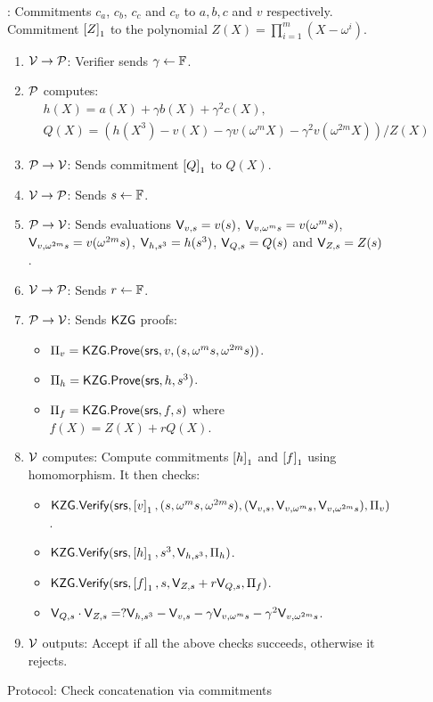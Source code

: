 \begin{figure}[htbp]
	\centering
	\begin{mdframed}
		{\footnotesize
			: Commitments $c_a$, $c_b$, $c_c$ and $c_v$ to $a,b,c$ and $v$ respectively. Commitment $\gone{Z}$ to the polynomial
			$Z(X)=\prod_{i=1}^m (X-\omega^i)$.
			\begin{enumerate}[leftmargin=2em]
				\item $\verifier\rightarrow\prover$: Verifier sends $\gamma\gets \F$.
				\item $\prover$ computes:
				\begin{align}
					& h(X) = a(X) + \gamma b(X) + \gamma^2 c(X),\\
					& Q(X) = (h(X^3) - v(X) - \gamma v(\omega^m X) - \gamma^2 v(\omega^{2m} X))/Z(X)
				\end{align}
				\item $\prover\rightarrow\verifier$: Sends commitment $\gone{Q}$ to $Q(X)$.
				\item $\verifier\rightarrow\prover$: Sends $s\gets\F$.
				\item $\prover\rightarrow\verifier$: Sends evaluations $\val{s}{v}=v(s)$, $\val{\omega^m s}{v}=v(\omega^m s)$,
				$\val{\omega^{2m}s}{v}=v(\omega^{2m} s)$, $\val{s^3}{h}=h(s^3)$, $\val{s}{Q}=Q(s)$ and $\val{s}{Z}=Z(s)$.
				\item $\verifier\rightarrow\prover$: Sends $r\gets\F$.
				\item $\prover\rightarrow\verifier$: Sends $\kzg$ proofs:
				\begin{itemize}[leftmargin=2em]
					\item $\Pi_v=\kzgprove(\srs,v,(s,\omega^m s, \omega^{2m}s))$.
					\item $\Pi_h=\kzgprove(\srs,h,s^3)$.
					\item $\Pi_f=\kzgprove(\srs,f,s)$ where $f(X)=Z(X) + rQ(X)$.
				\end{itemize}
				\item $\verifier$ computes: Compute commitments $\gone{h}$ and $\gone{f}$ using homomorphism. It then checks:
				\begin{itemize}[leftmargin=2em]
					\item $\kzgverify(\srs,\gone{v},(s,\omega^m s, \omega^{2m}s), (\val{s}{v}, \val{\omega^m s}{v}, \val{\omega^{2m} s}{v}),\Pi_v)$.
					\item $\kzgverify(\srs,\gone{h}, s^3, \val{s^3}{h},\Pi_h)$.
					\item $\kzgverify(\srs,\gone{f}, s, \val{s}{Z} + r\val{s}{Q}, \Pi_f)$.
					\item $\val{s}{Q}\cdot \val{s}{Z} =? \val{s^3}{h}-\val{s}{v}-\gamma \val{\omega^m s}{v}-\gamma^2\val{\omega^{2m}s}{v}$.
				\end{itemize}
				\item $\verifier$ outputs: Accept if all the above checks succeeds, otherwise it rejects.
			\end{enumerate}
		}
	\end{mdframed}
	\vspace*{-5mm}
	\caption{Protocol: Check concatenation via commitments}
	\label{fig:concatenation}
\end{figure}

